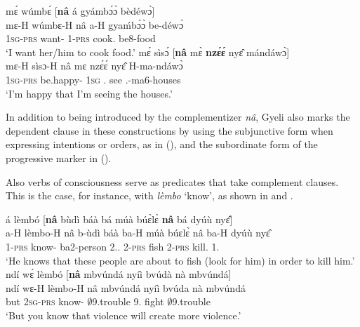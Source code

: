 \ea\label{COMP1}
  \glll  mɛ́ wúmbɛ́ [{\bfseries nâ} á gyámbɔ́ɔ̀ bèdéwɔ̀]\textsubscript{{\COMP}} \\
         mɛ-H wúmbɛ-H {\db}nâ a-H gyaḿbɔ́ɔ̀ be-déwɔ̀ \\
         1\textsc{sg}-\textsc{prs} want-{\R} {\db}{\COMP} 1-\textsc{prs} cook.{\SBJV} be8-food \\
    \trans `I want her/him to cook food.'
\ex\label{COMP}
  \glll mɛ́  sìsɔ́ [{\bfseries nâ} mɛ̀ {\bfseries nzɛ́ɛ́} nyɛ̂ mándáwɔ̀] \\
         mɛ-H sìsɔ-H {\db}nâ mɛ nzɛ́ɛ́ nyɛ̂ H-ma-ndáwɔ̀ \\
         1\textsc{sg}-\textsc{prs} be.happy-{\R} {\db}{\COMP} 1\textsc{sg} {\PROG}.{\SUB} see {\OBJ}.{\LINK}-ma6-houses \\
    \trans `I'm happy that I'm seeing the houses.'
\z

In addition to being introduced by the complementizer {\itshape nâ}, Gyeli also marks the dependent clause in these constructions by using the subjunctive form when expressing intentions or orders, as in  (), and the subordinate form of the progressive marker in  ().


Also verbs of consciousness serve as predicates that take complement clauses. This is the case, for instance, with {\itshape lèmbo} `know', as shown in  and .


\ea\label{COMP2}
  \glll   á lèmbó [{\bfseries nâ} bùdì báà bá múà búɛ̀lɛ̀ {\bfseries nâ} bá dyúù nyɛ̂]\textsubscript{{\COMP}}\\
          a-H lèmbo-H {\db}nâ b-ùdì báà ba-H múà búɛlɛ̀ nâ ba-H dyúù nyɛ̂\\
1-\textsc{prs} know-{\R} {\db}{\COMP} ba2-person 2.{\DEM}.{\PROX} 2-\textsc{prs} {\PROSP} fish {\COMP} 2-\textsc{prs} kill.{\SBJV} 1.{\OBJ}\\
    \trans `He knows that these people are about to fish (look for him) in order to kill him.'
\ex\label{COMP3} 
  \glll ndí wɛ́ lèmbó [{\bfseries nâ} mbvúndá nyíì bvúdà nà mbvúndá]\textsubscript{{\COMP}} \\
        ndí wɛ-H lèmbo-H {\db}nâ mbvúndá nyíì bvúda nà mbvúndá \\
         but 2\textsc{sg}-\textsc{prs} know-{\R} {\db}{\COMP} $\emptyset$9.trouble 9.{\FUT} fight {\COM} $\emptyset$9.trouble \\
    \trans `But you know that violence will create more violence.'
\z


